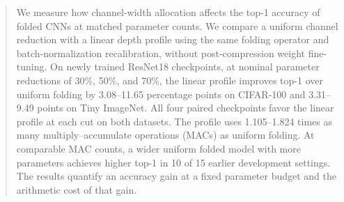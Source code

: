 \begin{abstract}
We measure how channel-width allocation affects the top-1 accuracy of
folded CNNs at matched parameter counts. We compare a uniform channel
reduction with a linear depth profile using the same folding operator and
batch-normalization recalibration, without post-compression weight
fine-tuning. On newly trained ResNet18 checkpoints, at nominal parameter
reductions of 30\%, 50\%, and 70\%, the linear profile improves top-1 over
uniform folding by 3.08--11.65 percentage points on CIFAR-100 and
3.31--9.49 points on Tiny ImageNet. All four paired checkpoints favor
the linear profile at each cut on both datasets. The profile uses
1.105--1.824 times as many multiply--accumulate operations (MACs) as
uniform folding. At comparable MAC counts, a wider uniform folded model
with more parameters achieves higher top-1 in 10 of 15 earlier development
settings. The results quantify an accuracy gain at a fixed parameter
budget and the arithmetic cost of that gain.
\end{abstract}
